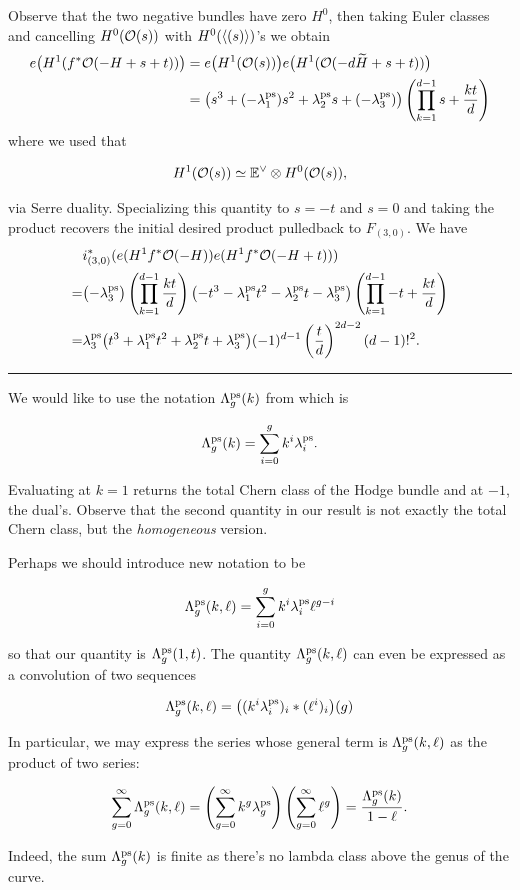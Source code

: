 \documentclass[12pt]{memoir}
\begin{document}
Observe that the two negative bundles have zero \(H^0\), then taking Euler classes and cancelling \(H^0(\mathcal{O}(s))\) with \(H^0(\left\langle (s)\right\rangle)\)'s we obtain
\begin{align*}
    e\bigl(H^1(f^\ast \mathcal{O}(-H+s+t))\bigr) & =e\bigl(H^1(\mathcal{O}(s))\bigr)e\bigl(H^1(\mathcal{O}(-d\widetilde{H}+s+t))\bigr)                                         \\
                                         & =\bigl(s^3+(-\lambda_1^{\operatorname{\mathrm{ps}}})s^2+\lambda_2^{\operatorname{\mathrm{ps}}} s+(-\lambda_3^{\operatorname{\mathrm{ps}}})\bigr)\left(\prod_{k=1}^{d-1}s+\frac{kt}{d}\right)
\end{align*}
where we used that

\[H^1(\mathcal{O}(s))\simeq \mathbb{E}^\vee\otimes H^0(\mathcal{O}(s)),\]

via Serre duality. Specializing this quantity to \(s=-t\) and \(s=0\) and taking the product recovers the initial desired product pulledback to \(F_{(3,0)}\). We have
\begin{align*}
      & i_{(3,0)}^\ast(e(H^1f^\ast\mathcal{O}(-H))e(H^1f^\ast\mathcal{O}(-H+t)))                                                                                                                \\
    = & \bigl(-\lambda_3^{\operatorname{\mathrm{ps}}}\bigr)\left(\prod_{k=1}^{d-1}\frac{kt}{d}\right)\bigl(-t^3-\lambda_1^{\operatorname{\mathrm{ps}}}t^2-\lambda_2^{\operatorname{\mathrm{ps}}}t-\lambda_3^{\operatorname{\mathrm{ps}}}\bigr)\left(\prod_{k=1}^{d-1}-t+\frac{kt}{d}\right) \\
    = & \lambda_3^{\operatorname{\mathrm{ps}}}\bigl(t^3+\lambda_1^{\operatorname{\mathrm{ps}}}t^2+\lambda_2^{\operatorname{\mathrm{ps}}}t+\lambda_3^{\operatorname{\mathrm{ps}}}\bigr)(-1)^{d-1}\left(\frac{t}{d}\right)^{2d-2}(d-1)!^2.
\end{align*}

\hrule

\begin{Rmk}\label{rmk-new-notn-hom-lambda}
    We would like to use the notation \(\Lambda_g^{\operatorname{\mathrm{ps}}}(k)\) from \cite{MattAndRenzo} which is

    \[\Lambda_g^{\operatorname{\mathrm{ps}}}(k)=\sum_{i=0}^{g}k^i\lambda_i^{\operatorname{\mathrm{ps}}}.\]

    Evaluating at \(k=1\) returns the total Chern class of the Hodge bundle and at \(-1\), the dual's. Observe that the second quantity in our result is not exactly the total Chern class, but the \emph{homogeneous} version.\par
    Perhaps we should introduce new notation to be

    \[\Lambda_g^{\operatorname{\mathrm{ps}}}(k,\ell)=\sum_{i=0}^{g}k^i\lambda_i^{\operatorname{\mathrm{ps}}}\ell^{g-i}\]

    so that our quantity is \(\Lambda_g^{\operatorname{\mathrm{ps}}}(1,t)\). The quantity \(\Lambda_g^{\operatorname{\mathrm{ps}}}(k,\ell)\) can even be expressed as a convolution of two sequences


    \[\Lambda_g^{\operatorname{\mathrm{ps}}}(k,\ell)= \bigl((k^i\lambda_i^{\operatorname{\mathrm{ps}}})_i\ast(\ell^i)_i\bigr)(g)
    \]


    In particular, we may express the series whose general term is \(\Lambda_g^{\operatorname{\mathrm{ps}}}(k,\ell)\) as the product of two series:

    \[\sum_{g=0}^{\infty}\Lambda_g^{\operatorname{\mathrm{ps}}}(k,\ell)=\left(\sum_{g=0}^{\infty}k^g\lambda_g^{\operatorname{\mathrm{ps}}}\right)\left(\sum_{g=0}^{\infty}\ell^g\right)=\frac{\Lambda_g^{\operatorname{\mathrm{ps}}}(k)}{1-\ell}.
    \]

    Indeed, the sum \(\Lambda_g^{\operatorname{\mathrm{ps}}}(k)\) is finite as there's no lambda class above the genus of the curve.
\end{Rmk}
\end{document}
